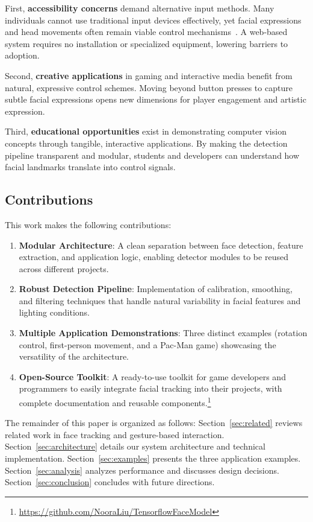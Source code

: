 \documentclass[sigconf]{acmart}
\begin{document}
First, \textbf{accessibility concerns} demand alternative input methods. Many individuals cannot use traditional input devices effectively, yet facial expressions and head movements often remain viable control mechanisms~\cite{wobbrock2011ability}. A web-based system requires no installation or specialized equipment, lowering barriers to adoption.

Second, \textbf{creative applications} in gaming and interactive media benefit from natural, expressive control schemes. Moving beyond button presses to capture subtle facial expressions opens new dimensions for player engagement and artistic expression.

Third, \textbf{educational opportunities} exist in demonstrating computer vision concepts through tangible, interactive applications. By making the detection pipeline transparent and modular, students and developers can understand how facial landmarks translate into control signals.

\subsection{Contributions}

This work makes the following contributions:

\begin{enumerate}
\item \textbf{Modular Architecture}: A clean separation between face detection, feature extraction, and application logic, enabling detector modules to be reused across different projects.

\item \textbf{Robust Detection Pipeline}: Implementation of calibration, smoothing, and filtering techniques that handle natural variability in facial features and lighting conditions.

\item \textbf{Multiple Application Demonstrations}: Three distinct examples (rotation control, first-person movement, and a Pac-Man game) showcasing the versatility of the architecture.

\item \textbf{Open-Source Toolkit}: A ready-to-use toolkit for game developers and programmers to easily integrate facial tracking into their projects, with complete documentation and reusable components.\footnote{\url{https://github.com/NooraLiu/TensorflowFaceModel}}
\end{enumerate}

The remainder of this paper is organized as follows: Section~\ref{sec:related} reviews related work in face tracking and gesture-based interaction. Section~\ref{sec:architecture} details our system architecture and technical implementation. Section~\ref{sec:examples} presents the three application examples. Section~\ref{sec:analysis} analyzes performance and discusses design decisions. Section~\ref{sec:conclusion} concludes with future directions.
\end{document}
